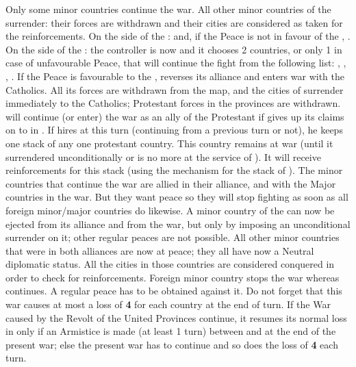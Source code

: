 \begin{digressions}
  \aparag Only some minor countries continue the war. All other minor
  countries of the \HRE surrender: their forces are withdrawn and their cities
  are considered as taken for the reinforcements.
  \bparag On the side of the \ligue: \HAB and, if the Peace is not in favour
  of the \alliance, \paysBaviere.
  \bparag On the side of the \alliance: the controller is now \SUE and it
  chooses 2 countries, or only 1 in case of unfavourable Peace, that will
  continue the fight from the following list: \paysHesse, \paysHanovre,
  \paysPalatinat, \paysSaxe.
  \bparag If the Peace is favourable to the \ligue, \paysSaxe reverses its
  alliance and enters war with the Catholics.  All its forces are withdrawn
  from the map, and the cities of \paysSaxe surrender immediately to the
  Catholics; Protestant forces in the provinces are withdrawn.
  \bparag \paysBrandebourg will continue (or enter) the war as an ally of the
  Protestant if \SUE gives up its claims on  to
  \paysBrandebourg in .
  \bparag If \FRA hires  at this turn (continuing from a
  previous turn or not), he keeps one stack of any one protestant
  country. This country remains at war (until it surrendered unconditionally
  or  is no more at the service of \FRA). It will receive
  reinforcements for this stack (using the mechanism for the stack of
  ).
  \aparag The minor countries that continue the war are allied in their
  alliance, and with the Major countries in the war. But they want peace so
  they will stop fighting as soon as all foreign minor/major countries do
  likewise.
  \bparag A minor country of the \HRE can now be ejected from its alliance and
  from the war, but only by imposing an unconditional surrender on it; other
  regular peaces are not possible.
  \aparag All other minor countries that were in both alliances are now at
  peace; they all have now a Neutral diplomatic status.  All the cities in
  those countries are considered conquered in order to check for
  reinforcements.
  \aparag Foreign minor country \DANmin stops the war whereas \HOLmin
  continues. A regular peace has to be obtained against it.
  \aparag Do not forget that this war causes at most a loss of {\bf 4} \STAB
  for each country at the end of turn.  If the War caused by the Revolt of the
  United Provinces continue, it resumes its normal loss in \STAB only if an
  Armistice is made (at least 1 turn) between \SPA and \HOL at the end of the
  present war; else the present war has to continue and so does the loss of
  {\bf 4} \STAB each turn.



\end{digressions}
